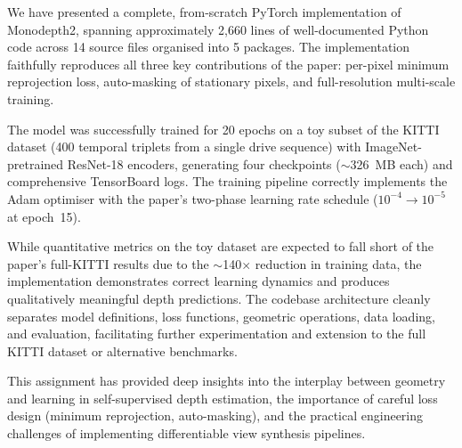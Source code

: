 \documentclass[10pt, a4paper, twocolumn]{article}
\begin{document}
We have presented a complete, from-scratch PyTorch implementation of Monodepth2, spanning approximately 2,660 lines of well-documented Python code across 14 source files organised into 5 packages. The implementation faithfully reproduces all three key contributions of the paper: per-pixel minimum reprojection loss, auto-masking of stationary pixels, and full-resolution multi-scale training.

The model was successfully trained for 20 epochs on a toy subset of the KITTI dataset (400 temporal triplets from a single drive sequence) with ImageNet-pretrained ResNet-18 encoders, generating four checkpoints ($\sim$326~MB each) and comprehensive TensorBoard logs. The training pipeline correctly implements the Adam optimiser with the paper's two-phase learning rate schedule ($10^{-4} \to 10^{-5}$ at epoch~15).

While quantitative metrics on the toy dataset are expected to fall short of the paper's full-KITTI results due to the $\sim$140$\times$ reduction in training data, the implementation demonstrates correct learning dynamics and produces qualitatively meaningful depth predictions. The codebase architecture cleanly separates model definitions, loss functions, geometric operations, data loading, and evaluation, facilitating further experimentation and extension to the full KITTI dataset or alternative benchmarks.

This assignment has provided deep insights into the interplay between geometry and learning in self-supervised depth estimation, the importance of careful loss design (minimum reprojection, auto-masking), and the practical engineering challenges of implementing differentiable view synthesis pipelines.
\end{document}
